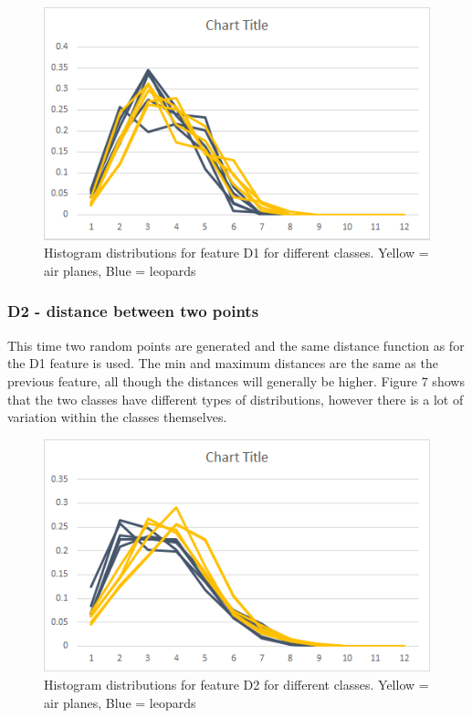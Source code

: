 \documentclass{bigdata}
\begin{document}
\begin{figure}[h!]
    \includegraphics[width=\linewidth]{Pictures/Part3/D1.png}
    \caption{Histogram distributions for feature D1 for different classes. Yellow = air planes, Blue = leopards}
  \label{fig:eccentricity}
\end{figure}

\subsubsection{D2 - distance between two points}
This time two random points are generated and the same distance function as for the D1 feature is used. The min and maximum distances are the same as the previous feature, all though the distances will generally be higher.
Figure 7 shows that the two classes have different types of distributions, however there is a lot of variation within the classes themselves.
\begin{figure}[h!]
    \includegraphics[width=\linewidth]{Pictures/Part3/D2.png}
    \caption{Histogram distributions for feature D2 for different classes. Yellow = air planes, Blue = leopards}
  \label{fig:eccentricity}
\end{figure}
\end{document}

